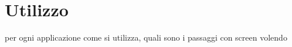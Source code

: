 \chapter*{Utilizzo}


per ogni applicazione come si utilizza, quali sono i passaggi con screen volendo